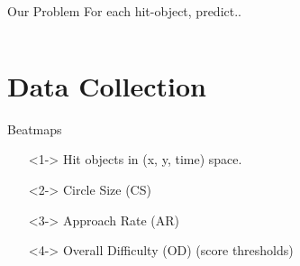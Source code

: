 \documentclass[table]{beamer}
\begin{document}
\begin{frame}{Our Problem}
  For each hit-object, predict..

  \vspace{\fill}

  \begin{columns}[T]

  \end{columns}
\end{frame}

\section{Data Collection}

\begin{frame}{Beatmaps}
  \begin{itemize}
  \item[]<1-> Hit objects in (x, y, time) space.
  \item[]<2-> Circle Size (CS)
  \item[]<3-> Approach Rate (AR)
  \item[]<4-> Overall Difficulty (OD) (score thresholds)
  \end{itemize}
\end{frame}
\end{document}
